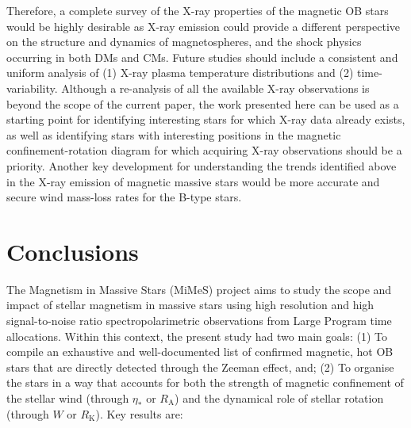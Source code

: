 \documentclass[useAMS,usenatbib]{mn2e}
\newcommand{\etas}{\eta_\ast}
\newcommand{\ra}{R_\mathrm{A}}
\newcommand{\rk}{R_\mathrm{K}}
\begin{document}
Therefore, a complete survey of the X-ray properties of the magnetic OB stars would be highly desirable as X-ray emission could provide a different perspective on the structure and dynamics of magnetospheres, and the shock physics occurring in both DMs and CMs.
Future studies should include a consistent and uniform analysis of (1) X-ray plasma temperature distributions and (2) time-variability. 
Although a re-analysis of all the available X-ray observations is beyond the scope of the current paper, the work presented here can be used as a starting point for identifying interesting stars for which X-ray data already exists, as well as identifying stars with interesting positions in the magnetic confinement-rotation diagram for which acquiring X-ray observations should be a priority.
Another key development for understanding the trends identified above in the X-ray emission of magnetic massive stars would be more accurate and secure wind mass-loss rates for the B-type stars.


\section{Conclusions}
\label{sec:conclu}


The Magnetism in Massive Stars (MiMeS) project aims to study the scope and impact of stellar magnetism in massive stars using high resolution and high signal-to-noise ratio spectropolarimetric observations from Large Program time allocations. 
Within this context, the present study had two main goals: (1) To compile an exhaustive and well-documented list of confirmed magnetic, hot OB stars that are directly detected through the Zeeman effect, and; (2) To organise the stars in a way that accounts for both the strength of magnetic confinement of the stellar wind (through $\etas$ or $\ra$) and the dynamical role of stellar rotation (through $W$ or $\rk$).
Key results are:
\end{document}
